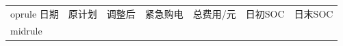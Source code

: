 \begin{tabular}{lrrrrrr}	oprule
日期 & 原计划 & 调整后 & 紧急购电 & 总费用/元 & 日初SOC & 日末SOC\\midrule

\bottomrule
\end{tabular}
